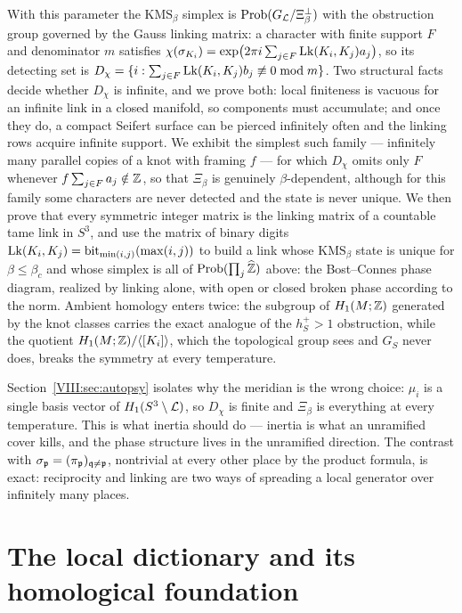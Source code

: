 \begin{summary}
With this parameter the $\mathrm{KMS}_\beta$ simplex is $\mathrm{Prob}(G_{\mathcal{L}}/\Xi_\beta^\perp)$ with
the obstruction group governed by the Gauss linking matrix: a character with finite support
$F$ and denominator $m$ satisfies
$\chi(\sigma_{K_i})=\exp\bigl(2\pi i\sum_{j\in F}\operatorname{Lk}(K_i,K_j)a_j\bigr)$, so its detecting set
is $D_\chi=\{i:\sum_{j\in F}\operatorname{Lk}(K_i,K_j)b_j\not\equiv0\bmod m\}$. Two structural facts decide
whether $D_\chi$ is infinite, and we prove both: local finiteness is vacuous for an infinite
link in a closed manifold, so components must accumulate; and once they do, a compact Seifert
surface can be pierced infinitely often and the linking rows acquire infinite support. We
exhibit the simplest such family --- infinitely many parallel copies of a knot with framing
$f$ --- for which $D_\chi$ omits only $F$ whenever $f\sum_{j\in F}a_j\notin\mathbb{Z}$, so that
$\Xi_\beta$ is genuinely $\beta$-dependent, although for this family some characters are
never detected and the state is never unique. We then prove that every symmetric integer
matrix is the linking matrix of a countable tame link in $S^3$, and use the matrix of
binary digits $\operatorname{Lk}(K_i,K_j)=\mathrm{bit}_{\min(i,j)}(\max(i,j))$ to build a link whose
$\mathrm{KMS}_\beta$ state is unique for $\beta\le\beta_c$ and whose simplex is all of
$\mathrm{Prob}(\prod_j\widehat{\mathbb{Z}})$ above: the Bost--Connes phase diagram, realized by linking alone, with
open or closed broken phase according to the norm. Ambient homology enters twice: the
subgroup of $H_1(M;\mathbb{Z})$ generated by the knot classes carries the exact analogue of the
$h^+_S>1$ obstruction, while the quotient $H_1(M;\mathbb{Z})/\langle[K_i]\rangle$, which the
topological group sees and $G_S$ never does, breaks the symmetry at every temperature.

Section~\ref{VIII:sec:autopsy} isolates why the meridian is the wrong choice: $\mu_i$ is a single
basis vector of $H_1(S^3\setminus\mathcal{L})$, so $D_\chi$ is finite and $\Xi_\beta$ is everything at
every temperature. This is what inertia should do --- inertia is what an unramified cover
kills, and the phase structure lives in the unramified direction. The contrast with
$\sigma_{\mathfrak{p}}=(\pi_{\mathfrak{p}})_{\mathfrak{q}\ne\mathfrak{p}}$, nontrivial at every other place by the product
formula, is exact: reciprocity and linking are two ways of spreading a local generator over
infinitely many places.
\end{summary}

\section{The local dictionary and its homological foundation}\label{VIII:sec:local}

